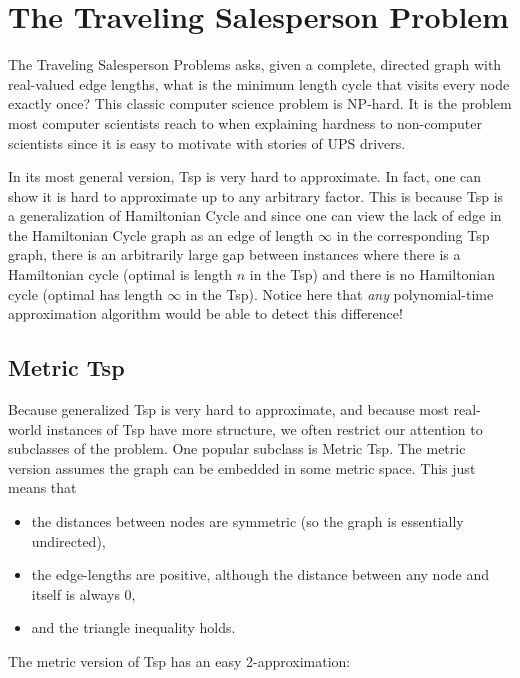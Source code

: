 \documentclass[11pt]{article}
\newcommand{\TSP}{{\sc Tsp}\xspace}
\begin{document}
\section{The Traveling Salesperson Problem} \label{sec:tsp}

The {\sc Traveling Salesperson Problems} asks, given a complete, directed graph with real-valued edge lengths, what is the minimum length cycle that visits every node exactly once?  This classic computer science problem is NP-hard.  It is the problem most computer scientists reach to when explaining hardness to non-computer scientists since it is easy to motivate with stories of UPS drivers. 

 In its most general version, \TSP is very hard to approximate.  In fact, one can show it is hard to approximate up to any arbitrary factor.  This is because \TSP is a generalization of {\sc Hamiltonian Cycle} and since one can view the lack of edge in the {\sc Hamiltonian Cycle} graph as an edge of length $\infty$ in the corresponding \TSP graph, there is an arbitrarily large gap between instances where there is a Hamiltonian cycle (optimal is length $n$ in the \TSP) and there is no Hamiltonian cycle (optimal has length $\infty$ in the \TSP).  Notice here that {\em any} polynomial-time approximation algorithm would be able to detect this difference! 

\subsection{Metric \TSP} \label{sec:metric}

Because generalized \TSP is very hard to approximate, and because most real-world instances of \TSP have more structure, we often restrict our attention to subclasses of the problem.  One popular subclass is {\sc Metric \TSP}.  The metric version assumes the graph can be embedded in some metric space.  This just means that

\begin{itemize}
	\item the distances between nodes are symmetric (so the graph is essentially undirected),
	\item the edge-lengths are positive, although the distance between any node and itself is always 0, 
	\item and the triangle inequality holds.
\end{itemize}

\noindent The metric version of \TSP has an easy 2-approximation:
\end{document}
